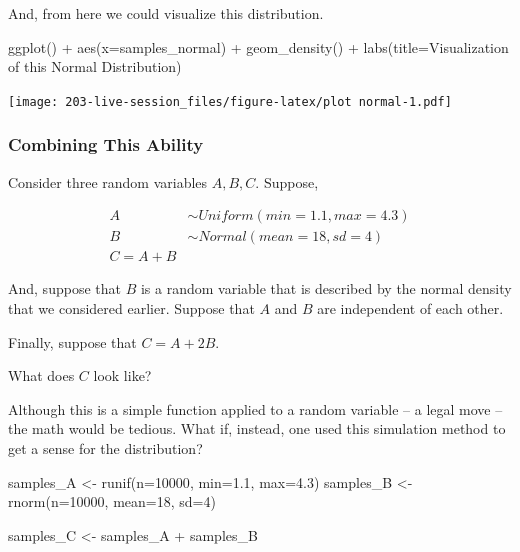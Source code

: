 \documentclass[
]{book}
\newenvironment{Shaded}{\begin{snugshade}}{\end{snugshade}}
\newcommand{\AttributeTok}[1]{\textcolor[rgb]{0.77,0.63,0.00}{#1}}
\newcommand{\DecValTok}[1]{\textcolor[rgb]{0.00,0.00,0.81}{#1}}
\newcommand{\FloatTok}[1]{\textcolor[rgb]{0.00,0.00,0.81}{#1}}
\newcommand{\FunctionTok}[1]{\textcolor[rgb]{0.00,0.00,0.00}{#1}}
\newcommand{\NormalTok}[1]{#1}
\newcommand{\OtherTok}[1]{\textcolor[rgb]{0.56,0.35,0.01}{#1}}
\newcommand{\SpecialCharTok}[1]{\textcolor[rgb]{0.00,0.00,0.00}{#1}}
\newcommand{\StringTok}[1]{\textcolor[rgb]{0.31,0.60,0.02}{#1}}
\theoremstyle{definition}
\theoremstyle{definition}
\theoremstyle{definition}
\theoremstyle{definition}
\theoremstyle{remark}
\begin{document}
And, from here we could visualize this distribution.

\begin{Shaded}
\begin{Highlighting}[]
\FunctionTok{ggplot}\NormalTok{() }\SpecialCharTok{+} 
  \FunctionTok{aes}\NormalTok{(}\AttributeTok{x=}\NormalTok{samples\_normal) }\SpecialCharTok{+} 
  \FunctionTok{geom\_density}\NormalTok{() }\SpecialCharTok{+} 
  \FunctionTok{labs}\NormalTok{(}\AttributeTok{title=}\StringTok{\textquotesingle{}Visualization of this Normal Distribution\textquotesingle{}}\NormalTok{)}
\end{Highlighting}
\end{Shaded}

\texttt{[image: 203-live-session\_files/figure-latex/plot normal-1.pdf]}

\hypertarget{combining-this-ability}{%
\subsubsection{Combining This Ability}\label{combining-this-ability}}

Consider three random variables \(A, B, C\). Suppose,

\[ 
  \begin{aligned}
    A & \sim Uniform(min=1.1, max=4.3) \\ 
    B & \sim Normal(mean=18, sd=4)     \\ 
    C = A + B
  \end{aligned}
\]

And, suppose that \(B\) is a random variable that is described by the normal density that we considered earlier. Suppose that \(A\) and \(B\) are independent of each other.

Finally, suppose that \(C = A + 2B\).

What does \(C\) look like?

Although this is a simple function applied to a random variable -- a legal move -- the math would be tedious. What if, instead, one used this simulation method to get a sense for the distribution?

\begin{Shaded}
\begin{Highlighting}[]
\NormalTok{samples\_A }\OtherTok{\textless{}{-}} \FunctionTok{runif}\NormalTok{(}\AttributeTok{n=}\DecValTok{10000}\NormalTok{, }\AttributeTok{min=}\FloatTok{1.1}\NormalTok{, }\AttributeTok{max=}\FloatTok{4.3}\NormalTok{)}
\NormalTok{samples\_B }\OtherTok{\textless{}{-}} \FunctionTok{rnorm}\NormalTok{(}\AttributeTok{n=}\DecValTok{10000}\NormalTok{, }\AttributeTok{mean=}\DecValTok{18}\NormalTok{, }\AttributeTok{sd=}\DecValTok{4}\NormalTok{)}

\NormalTok{samples\_C }\OtherTok{\textless{}{-}}\NormalTok{ samples\_A }\SpecialCharTok{+}\NormalTok{ samples\_B}
\end{Highlighting}
\end{Shaded}
\end{document}
